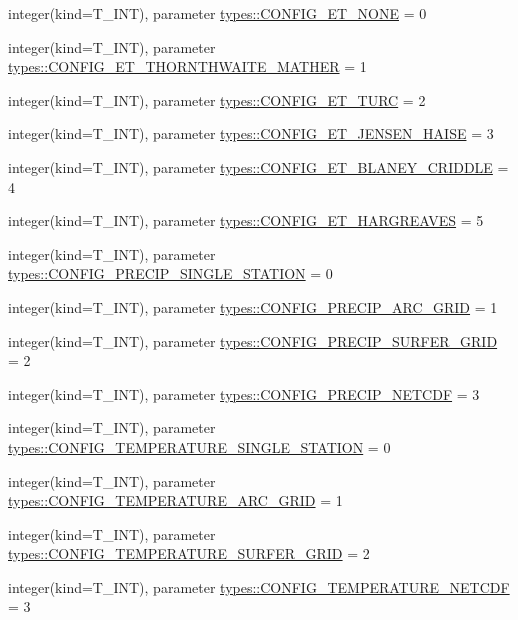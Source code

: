 \begin{DoxyCompactItemize}
\item 
integer(kind=T\_\-INT), parameter \hyperlink{namespacetypes_aa00d17553b5924914a0c6101d2a3af21}{types::CONFIG\_\-ET\_\-NONE} = 0
\item 
integer(kind=T\_\-INT), parameter \hyperlink{namespacetypes_aa1f3f7bad7912d092d9b1a8f726e4f47}{types::CONFIG\_\-ET\_\-THORNTHWAITE\_\-MATHER} = 1
\item 
integer(kind=T\_\-INT), parameter \hyperlink{namespacetypes_a402a872e6930d08699d8371bd68f0247}{types::CONFIG\_\-ET\_\-TURC} = 2
\item 
integer(kind=T\_\-INT), parameter \hyperlink{namespacetypes_a96a773d2a9e9595b49aaee65d3618d28}{types::CONFIG\_\-ET\_\-JENSEN\_\-HAISE} = 3
\item 
integer(kind=T\_\-INT), parameter \hyperlink{namespacetypes_af0221b3cca59af99efb7f293b9c19cd7}{types::CONFIG\_\-ET\_\-BLANEY\_\-CRIDDLE} = 4
\item 
integer(kind=T\_\-INT), parameter \hyperlink{namespacetypes_a49692bf2a330b895cc7748e71c099d36}{types::CONFIG\_\-ET\_\-HARGREAVES} = 5
\item 
integer(kind=T\_\-INT), parameter \hyperlink{namespacetypes_ac2eb7f45340cf35eb5bf1d5929b09f7f}{types::CONFIG\_\-PRECIP\_\-SINGLE\_\-STATION} = 0
\item 
integer(kind=T\_\-INT), parameter \hyperlink{namespacetypes_afabf941aeacf590c7e1d6aa9aed0cbbd}{types::CONFIG\_\-PRECIP\_\-ARC\_\-GRID} = 1
\item 
integer(kind=T\_\-INT), parameter \hyperlink{namespacetypes_abcdf72d1f81b2916cf775e1431de6b29}{types::CONFIG\_\-PRECIP\_\-SURFER\_\-GRID} = 2
\item 
integer(kind=T\_\-INT), parameter \hyperlink{namespacetypes_af0fe53cfc13c9f0ce2c3a80d2732c602}{types::CONFIG\_\-PRECIP\_\-NETCDF} = 3
\item 
integer(kind=T\_\-INT), parameter \hyperlink{namespacetypes_a821c4b808dde869fec2b125892518a86}{types::CONFIG\_\-TEMPERATURE\_\-SINGLE\_\-STATION} = 0
\item 
integer(kind=T\_\-INT), parameter \hyperlink{namespacetypes_a6d33c5d4a9049260961a4a2ab73ea6c1}{types::CONFIG\_\-TEMPERATURE\_\-ARC\_\-GRID} = 1
\item 
integer(kind=T\_\-INT), parameter \hyperlink{namespacetypes_af01dca6362f0a51f0e5091ef26571bc8}{types::CONFIG\_\-TEMPERATURE\_\-SURFER\_\-GRID} = 2
\item 
integer(kind=T\_\-INT), parameter \hyperlink{namespacetypes_a8c7057d336d6c65e7b528b189e6383ff}{types::CONFIG\_\-TEMPERATURE\_\-NETCDF} = 3

\end{DoxyCompactItemize}
